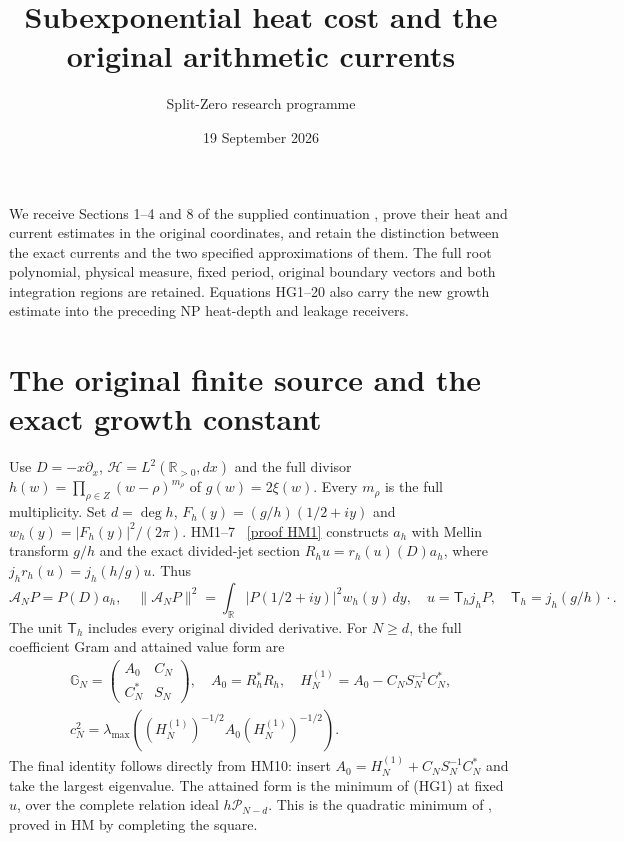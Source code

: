 \documentclass[11pt]{article}
\title{Subexponential heat cost and the original arithmetic currents}
\author{Split-Zero research programme}\date{19 September 2026}
\newcommand{\C}{\mathbb C}\newcommand{\R}{\mathbb R}
\begin{document}
\maketitle
We receive Sections 1--4 and 8 of the supplied continuation
\cite{web}, prove their heat and current estimates in the original
coordinates, and retain the distinction between the exact currents and
the two specified approximations of them. The full root polynomial,
physical measure, fixed period, original boundary vectors and both
integration regions are retained. Equations HG1--20 also carry the new
growth estimate into the preceding NP heat-depth and leakage receivers.

\section{The original finite source and the exact growth constant}
Use $D=-x\partial_x$, $\mathcal H=L^2(\R_{>0},dx)$ and the full divisor
$h(w)=\prod_{\rho\in Z}(w-\rho)^{m_\rho}$ of $g(w)=2\xi(w)$.
Every $m_\rho$ is the full multiplicity. Set $d=\deg h$,
$F_h(y)=(g/h)(1/2+iy)$ and $w_h(y)=|F_h(y)|^2/(2\pi)$.
HM1--7 \cite{HM}%
~\href{https://github.com/KokunoYumeto/zeta-function-research-reader/blob/5992ad50c0f2a06921f1fcaded7b4e38097c0739/workbenches/splitzero-tandem/continuations/20260920-original-kernel-mixed-determinants/providers/HEAT_TO_ORIGINAL_QUOTIENT_METRICS.tex\#L31}{[proof HM1]}%
{} constructs $a_h$ with Mellin transform $g/h$ and
the exact divided-jet section $R_hu=r_h(u)(D)a_h$, where
$j_hr_h(u)=j_h(h/g)u$. Thus
\[
 \mathcal A_NP=P(D)a_h,\quad
 \|\mathcal A_NP\|^2=\int_\R|P(1/2+iy)|^2w_h(y)\,dy,
 \quad u=\mathsf T_hj_hP,\quad \mathsf T_h=j_h(g/h)\cdot .\tag{HG1}
\]
The unit $\mathsf T_h$ includes every original divided derivative.
For $N\ge d$, the full coefficient Gram and attained value form are
\[
\begin{gathered}
 \mathbb G_N=\begin{pmatrix}A_0&C_N\\C_N^*&S_N\end{pmatrix},\quad
 A_0=R_h^*R_h,\quad H_N^{(1)}=A_0-C_NS_N^{-1}C_N^*,
 \\
 c_N^2=\lambda_{\max}((H_N^{(1)})^{-1/2}A_0(H_N^{(1)})^{-1/2}).
\end{gathered}
 \tag{HG2}
\]
The final identity follows directly from HM10: insert
$A_0=H_N^{(1)}+C_NS_N^{-1}C_N^*$ and take the largest eigenvalue.
The attained form is the minimum of (HG1) at fixed $u$, over the complete
relation ideal $h\mathcal P_{N-d}$. This is the quadratic minimum of
\cite[Appendix C.4.1]{Boyd}, proved in HM by completing the square.
\end{document}

